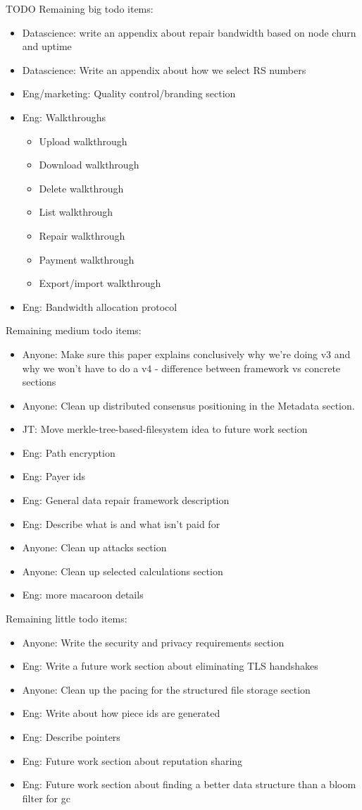 \documentclass[a4paper,10pt]{article} \usepackage[utf8]{inputenc}
\newcommand{\todo}[1]{{\color{red} TODO #1 }}
\begin{document}
\todo{
Remaining big todo items:
\begin{itemize}
\item Datascience: write an appendix about repair bandwidth based on node
  churn and uptime
\item Datascience: Write an appendix about how we select RS numbers
\item Eng/marketing: Quality control/branding section
\item Eng: Walkthroughs
\begin{itemize}
\item Upload walkthrough
\item Download walkthrough
\item Delete walkthrough
\item List walkthrough
\item Repair walkthrough
\item Payment walkthrough
\item Export/import walkthrough
\end{itemize}
\item Eng: Bandwidth allocation protocol
\end{itemize}

Remaining medium todo items:
\begin{itemize}
\item Anyone: Make sure this paper explains conclusively why we're doing v3 and
  why we won't have to do a v4 - difference between framework vs concrete
  sections
\item Anyone:
  Clean up distributed consensus positioning in the Metadata section.
\item JT: Move merkle-tree-based-filesystem idea to future work section
\item Eng: Path encryption
\item Eng: Payer ids
\item Eng: General data repair framework description
\item Eng: Describe what is and what isn't paid for
\item Anyone: Clean up attacks section
\item Anyone: Clean up selected calculations section
\item Eng: more macaroon details
\end{itemize}

Remaining little todo items:
\begin{itemize}
\item Anyone: Write the security and privacy requirements section
\item Eng: Write a future work section about eliminating TLS handshakes
\item Anyone: Clean up the pacing for the structured file storage section
\item Eng: Write about how piece ids are generated
\item Eng: Describe pointers
\item Eng: Future work section about reputation sharing
\item Eng: Future work section about finding a better data structure than
 a bloom filter for gc
\end{itemize}
}
\end{document}
